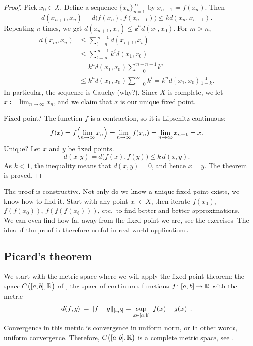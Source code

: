 \begin{proof}
Pick $x_0 \in X$.
Define a sequence $\{ x_n \}_{n=1}^\infty$ by $x_{n+1} \coloneqq f(x_n)$.  Then
\begin{equation*}
d(x_{n+1},x_n) = d\bigl(f(x_n),f(x_{n-1})\bigr)
\leq k d(x_n,x_{n-1}) .
\end{equation*}
Repeating $n$ times, we get $d(x_{n+1},x_n) \leq k^n d(x_1,x_0)$.
For $m > n$,
\begin{equation*}
\begin{split}
d(x_m,x_n)
& \leq \sum_{i=n}^{m-1} d(x_{i+1},x_i) \\
& \leq \sum_{i=n}^{m-1} k^i d(x_1,x_0) \\
& = k^n d(x_1,x_0) \sum_{i=0}^{m-n-1} k^i \\
& \leq k^n d(x_1,x_0) \sum_{i=0}^{\infty} k^i
= k^n d(x_1,x_0) \frac{1}{1-k} .
\end{split}
\end{equation*}
In particular, the sequence is Cauchy (why?).  Since $X$ is complete,
we let $x \coloneqq \lim_{n\to\infty} x_n$, and we claim that $x$
is our unique fixed point.

Fixed point?  The function $f$ is a contraction,
so it is Lipschitz continuous:
\begin{equation*}
f(x) = f\Bigl( \lim_{n\to\infty} x_n\Bigr) = \lim_{n\to\infty} f(x_n) =
\lim_{n\to\infty} x_{n+1} = x .
\end{equation*}
Unique?  Let $x$ and $y$ be fixed points.
\begin{equation*}
d(x,y) = d\bigl(f(x),f(y)\bigr) \leq k\, d(x,y) .
\end{equation*}
As $k < 1$, the inequality means that $d(x,y) = 0$, and hence $x=y$.  The theorem is
proved.
\end{proof}

The proof is constructive.  Not only do we know 
a unique fixed point exists, we know how to find it.  Start with
any point $x_0 \in X$, then iterate $f(x_0)$,
$f(f(x_0))$,
$f(f(f(x_0)))$, etc.\ to find better and better approximations.
We can even find how far away
from the fixed point we are, see the exercises.  The idea of the proof is
therefore useful in real-world applications.

\subsection{Picard's theorem}

We start with the metric space where we will apply the
fixed point theorem:
the space $C\bigl([a,b],{\mathbb{R}}\bigr)$ of ,
the space of continuous functions $f \colon [a,b] \to {\mathbb{R}}$ with the metric
\begin{equation*}
d(f,g) \coloneqq \lVert {f-g} \rVert_{[a,b]} = \sup_{x \in [a,b]} \left\lvert {f(x)-g(x)} \right\rvert .
\end{equation*}
Convergence in this metric is convergence in uniform norm, or in other
words, uniform convergence.  Therefore,
$C\bigl([a,b],{\mathbb{R}}\bigr)$ is a complete metric space,
see .

